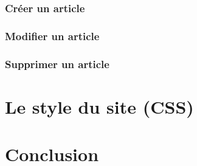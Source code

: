 \documentclass[hidelinks, 12pt,a4paper]{article}
\begin{document}
\subsubsection{Créer un article}
\subsubsection{Modifier un article}
\subsubsection{Supprimer un article}


\newpage
\section{Le style du site (CSS)}

\newpage
\section{Conclusion}
\end{document}
